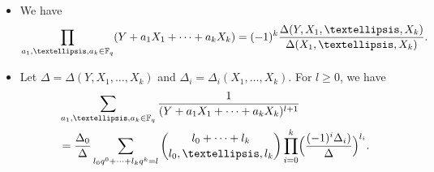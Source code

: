 \documentclass[10pt,a4paper]{amsart}
\begin{document}
\begin{lem}\label{carlitz-formula}\
\begin{itemize}
\item[(i)] We have
\begin{equation}\label{moore-det}
\prod_{a_1,\dots,a_k\in\Bbb F_q}(Y+a_1X_1+\cdots+a_kX_k)=(-1)^{k}\frac{\Delta(Y,X_1,\dots,X_k)}{\Delta(X_1,\dots,X_k)}.
\end{equation}

\item[(ii)] Let $\Delta=\Delta(Y,X_1,\dots,X_k)$ and $\Delta_i=\Delta_i(X_1,\dots,X_k)$.
For $l\ge 0$, we have
\begin{align}\label{Car}
&\sum_{a_1,\dots,a_k\in\Bbb F_q}\frac 1{(Y+a_1X_1+\cdots+a_kX_k)^{l+1}}\\
&=\frac{\Delta_0}\Delta\sum_{l_0q^0+\cdots+l_kq^k=l}\binom{l_0+\cdots+l_k}{l_0,\dots,l_k}\prod_{i=0}^k\Bigl(\frac{(-1)^i\Delta_i)}\Delta\Bigr)^{l_i}.\nonumber
\end{align}
\end{itemize}
\end{lem}
\end{document}
